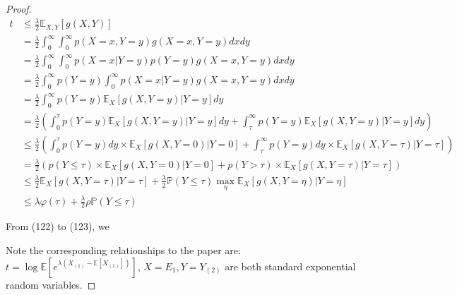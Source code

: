 \documentclass{article}
\theoremstyle{plain}
\begin{document}
\begin{proof}
\begin{align}
    t & \leq  \frac{\lambda}{2} \mathbb{E}_{X, Y}[g(X, Y)]\\
    & = \frac{\lambda}{2}\int _0^{\infty} \int_0^{\infty} p(X = x, Y = y) g(X = x, Y = y) dxdy\\
    & = \frac{\lambda}{2}\int _0^{\infty} \int_0^{\infty} p(X = x|Y = y) p(Y = y)g(X = x, Y = y) dxdy\\
    & = \frac{\lambda}{2}\int _0^{\infty} p(Y = y) \int_0^{\infty} p(X = x|Y = y) g(X = x, Y = y) dxdy\\
    & = \frac{\lambda}{2}\int _0^{\infty} p(Y = y) \mathbb{E}_X[g(X, Y = y)| Y = y]dy\\
    & = \frac{\lambda}{2}\left(\int _0^{\tau} p(Y = y) \mathbb{E}_X[g(X, Y = y)| Y = y]dy + \int _\tau^{\infty} p(Y = y) \mathbb{E}_X[g(X, Y = y)| Y = y]dy\right)\\
    & \leq \frac{\lambda}{2}\left(\int _0^{\tau} p(Y = y) dy \times \mathbb{E}_X[g(X, Y = 0)| Y = 0] + \int _\tau^{\infty} p(Y = y) dy \times \mathbb{E}_X[g(X, Y = \tau)| Y = \tau] \right)\\
    & = \frac{\lambda}{2}\left(p(Y \leq \tau) \times \mathbb{E}_X[g(X, Y = 0)| Y = 0] + p(Y > \tau) \times \mathbb{E}_X[g(X, Y = \tau)| Y = \tau] \right)\\
    & \leq \frac{\lambda}{2} \mathbb{E}_X[g(X, Y = \tau)|Y = \tau] + \frac{\lambda}{2} \mathbb{P}(Y \leq \tau) \max_{\eta} \mathbb{E}_X[g(X, Y = \eta)|Y = \eta]\\
    & \leq \lambda \varphi(\tau) + \frac{\lambda}{2} \rho \mathbb{P}(Y \leq \tau)
\end{align}

From (122) to (123), we 

Note the corresponding relationships to the paper are:\\

$t = \log \mathbb{E} [e^{\lambda (X_{(1)} - \mathbb{E}[X_{(1)}])}]$, $X = E_1, Y = Y_{(2)}$ are both standard exponential random variables. 
\end{proof}


\printbibliography
\end{document}
